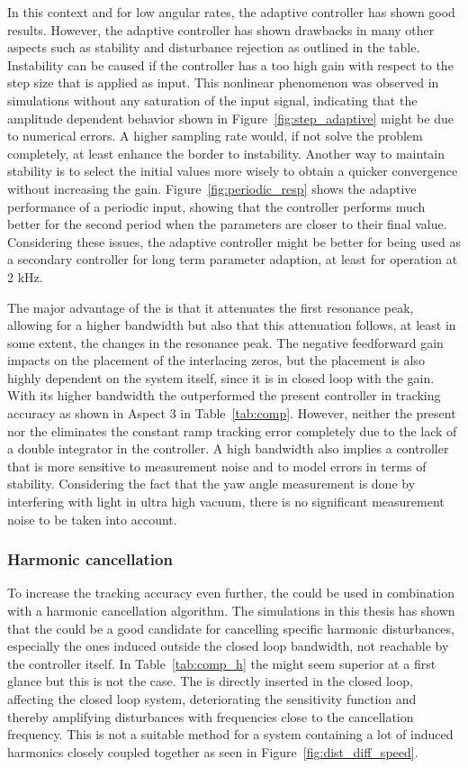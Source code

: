 In this context and for low angular rates, the adaptive controller has shown good results. However, the adaptive controller has shown drawbacks in many other aspects such as stability and disturbance rejection as outlined in the table. Instability can be caused if the controller has a too high gain with respect to the step size that is applied as input. This nonlinear phenomenon was observed in simulations without any saturation of the input signal, indicating that the amplitude dependent behavior shown in Figure~\ref{fig:step_adaptive} might be due to numerical errors. A higher sampling rate would, if not solve the problem completely, at least enhance the border to instability. Another way to maintain stability is to select the initial values more wisely to obtain a quicker convergence without increasing the gain. Figure~\ref{fig:periodic_resp} shows the adaptive performance of a periodic input, showing that the controller performs much better for the second period when the parameters are closer to their final value. Considering these issues, the adaptive controller might be better for being used as a secondary controller for long term parameter adaption, at least for operation at 2 kHz.

The major advantage of the \abbrIRC is that it attenuates the first resonance peak, allowing for a higher bandwidth but also that this attenuation follows, at least in some extent, the changes in the resonance peak. The negative feedforward gain impacts on the placement of the interlacing zeros, but the placement is also highly dependent on the system itself, since it is in closed loop with the gain. With its higher bandwidth the \abbrIRC outperformed the present controller in tracking accuracy as shown in Aspect 3 in Table~\ref{tab:comp}. However, neither the present nor the \abbrIRC eliminates the constant ramp tracking error completely due to the lack of a double integrator in the controller. A high bandwidth also implies a controller that is more sensitive to measurement noise and to model errors in terms of stability. Considering the fact that the yaw angle measurement is done by interfering with light in ultra high vacuum, there is no significant measurement noise to be taken into account.

\subsubsection{Harmonic cancellation}
To increase the tracking accuracy even further, the \abbrIRC could be used in combination with a harmonic cancellation algorithm. The simulations in this thesis has shown that the \abbrRFDC could be a good candidate for cancelling specific harmonic disturbances, especially the ones induced outside the closed loop bandwidth, not reachable by the controller itself. In Table~\ref{tab:comp_h} the \abbrIMP might seem superior at a first glance but this is not the case. The \abbrIMP is directly inserted in the closed loop, affecting the closed loop system, deteriorating the sensitivity function and thereby amplifying disturbances with frequencies close to the cancellation frequency. This is not a suitable method for a system containing a lot of induced harmonics closely coupled together as seen in Figure~\ref{fig:dist_diff_speed}.

